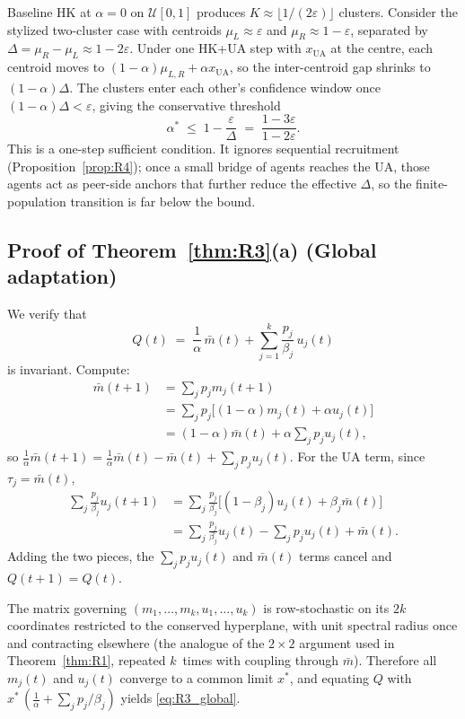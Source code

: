 \documentclass{article}
\theoremstyle{plain}
\theoremstyle{definition}
\theoremstyle{remark}
\newcommand{\xUA}{x_{\mathrm{UA}}}
\newcommand{\mbar}{\bar{m}}
\begin{document}
Baseline HK at $\alpha=0$ on $\mathcal{U}[0,1]$ produces
$K\approx\lfloor 1/(2\varepsilon)\rfloor$ clusters.  Consider the
stylized two-cluster case with centroids $\mu_L\approx\varepsilon$
and $\mu_R\approx 1-\varepsilon$, separated by
$\Delta=\mu_R-\mu_L\approx 1-2\varepsilon$.  Under one HK+UA step
with $\xUA$ at the centre, each centroid moves to
$(1-\alpha)\mu_{L,R}+\alpha\xUA$, so the inter-centroid gap shrinks
to $(1-\alpha)\Delta$.  The clusters enter each other's confidence
window once $(1-\alpha)\Delta<\varepsilon$, giving the conservative
threshold
\[
    \alpha^*
    \;\le\; 1 - \frac{\varepsilon}{\Delta}
    \;=\; \frac{1-3\varepsilon}{1-2\varepsilon}.
\]
This is a one-step sufficient condition.  It ignores sequential
recruitment (Proposition~\ref{prop:R4}); once a small bridge of
agents reaches the UA, those agents act as peer-side anchors that
further reduce the effective $\Delta$, so the finite-population
transition is far below the bound.

\subsection{Proof of Theorem~\ref{thm:R3}(a) (Global adaptation)}

We verify that
\[
    Q(t) \;=\; \frac{1}{\alpha}\,\mbar(t)
        + \sum_{j=1}^{k} \frac{p_j}{\beta_j}\,u_j(t)
\]
is invariant.  Compute:
\begin{align*}
    \mbar(t+1)
    &= \sum_j p_j m_j(t+1)\\
    &= \sum_j p_j\big[(1-\alpha)m_j(t) + \alpha u_j(t)\big]\\
    &= (1-\alpha)\mbar(t) + \alpha\sum_j p_j u_j(t),
\end{align*}
so
$\frac{1}{\alpha}\mbar(t+1)
   = \frac{1}{\alpha}\mbar(t) - \mbar(t) + \sum_j p_j u_j(t)$.
For the UA term, since $\tau_j=\mbar(t)$,
\begin{align*}
    \sum_j \frac{p_j}{\beta_j} u_j(t+1)
    &= \sum_j \frac{p_j}{\beta_j}\Big[(1-\beta_j)u_j(t)+\beta_j\mbar(t)\Big]\\
    &= \sum_j \frac{p_j}{\beta_j}u_j(t) - \sum_j p_j u_j(t)
       + \mbar(t).
\end{align*}
Adding the two pieces, the $\sum_j p_j u_j(t)$ and $\mbar(t)$ terms
cancel and $Q(t+1)=Q(t)$.

The matrix governing $(m_1,\ldots,m_k,u_1,\ldots,u_k)$ is row-stochastic
on its $2k$ coordinates restricted to the conserved hyperplane, with
unit spectral radius once and contracting elsewhere (the analogue of
the $2\times 2$ argument used in Theorem~\ref{thm:R1}, repeated
$k$~times with coupling through $\mbar$).  Therefore all $m_j(t)$
and $u_j(t)$ converge to a common limit $x^*$, and equating $Q$ with
$x^*\,(\frac{1}{\alpha}+\sum_j p_j/\beta_j)$ yields
\eqref{eq:R3_global}.
\end{document}
